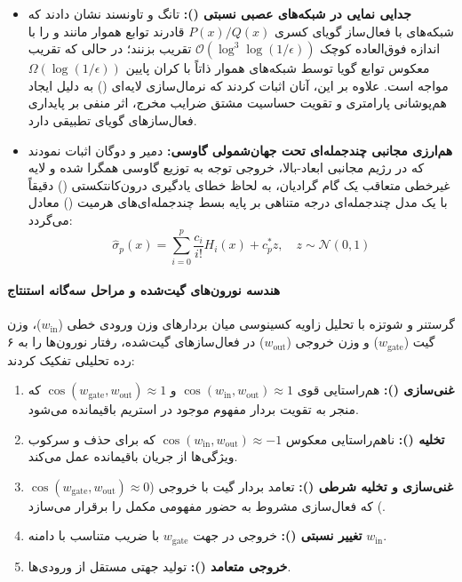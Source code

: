 \begin{itemize}
    \item \textbf{جدایی نمایی در شبکه‌های عصبی نسبتی ():} تانگ و تاونسند \cite{tang2026rational} نشان دادند که شبکه‌های با فعال‌ساز گویای کسری $P(x)/Q(x)$ قادرند توابع هموار مانند  و  را با اندازه فوق‌العاده کوچک $\mathcal{O}(\log^3 \log(1/\epsilon))$ تقریب بزنند؛ در حالی که تقریب معکوس توابع گویا توسط شبکه‌های هموار ذاتاً با کران پایین $\Omega(\log(1/\epsilon))$ مواجه است. علاوه بر این، آنان اثبات کردند که نرمال‌سازی لایه‌ای () به دلیل ایجاد هم‌پوشانی پارامتری و تقویت حساسیت مشتق ضرایب مخرج، اثر منفی بر پایداری فعال‌ساز‌های گویای تطبیقی دارد.
    
    \item \textbf{هم‌ارزی مجانبی چندجمله‌ای تحت جهان‌شمولی گاوسی:} دمیر و دوگان \cite{demir2026data} اثبات نمودند که در رژیم مجانبی ابعاد-بالا، خروجی توجه به توزیع گاوسی همگرا شده و لایه  غیرخطی متعاقب یک گام گرادیان، به لحاظ خطای یادگیری درون‌کانتکستی () دقیقاً با یک مدل چندجمله‌ای درجه متناهی بر پایه بسط چندجمله‌ای‌های هرمیت () معادل می‌گردد:
    \begin{equation}
        \hat{\sigma}_p(x) = \sum_{i=0}^p \frac{c_i}{i!} H_i(x) + c_p^* z, \quad z \sim \mathcal{N}(0, 1)
    \end{equation}
\end{itemize}

\paragraph*{هندسه نورون‌های گیت‌شده و مراحل سه‌گانه استنتاج}
گرستنر و شوتزه \cite{gerstner2025understanding} با تحلیل زاویه کسینوسی میان بردارهای وزن ورودی خطی ($w_{\text{in}}$)، وزن گیت ($w_{\text{gate}}$) و وزن خروجی ($w_{\text{out}}$) در فعال‌ساز‌های گیت‌شده، رفتار نورون‌ها را به ۶ رده تحلیلی تفکیک کردند:
\begin{enumerate}
    \item \textbf{غنی‌سازی ():} هم‌راستایی قوی $\cos(w_{\text{in}}, w_{\text{out}}) \approx 1$ و $\cos(w_{\text{gate}}, w_{\text{out}}) \approx 1$ که منجر به تقویت بردار مفهوم موجود در استریم باقیمانده می‌شود.
    \item \textbf{تخلیه ():} ناهم‌راستایی معکوس $\cos(w_{\text{in}}, w_{\text{out}}) \approx -1$ که برای حذف و سرکوب ویژگی‌ها از جریان باقیمانده عمل می‌کند.
    \item \textbf{غنی‌سازی و تخلیه شرطی ():} تعامد بردار گیت با خروجی ($\cos(w_{\text{gate}}, w_{\text{out}}) \approx 0$) که فعال‌سازی مشروط به حضور مفهومی مکمل را برقرار می‌سازد.
    \item \textbf{تغییر نسبتی ():} خروجی در جهت $w_{\text{gate}}$ با ضریب متناسب با دامنه $w_{\text{in}}$.
    \item \textbf{خروجی متعامد ():} تولید جهتی مستقل از ورودی‌ها.
\end{enumerate}

